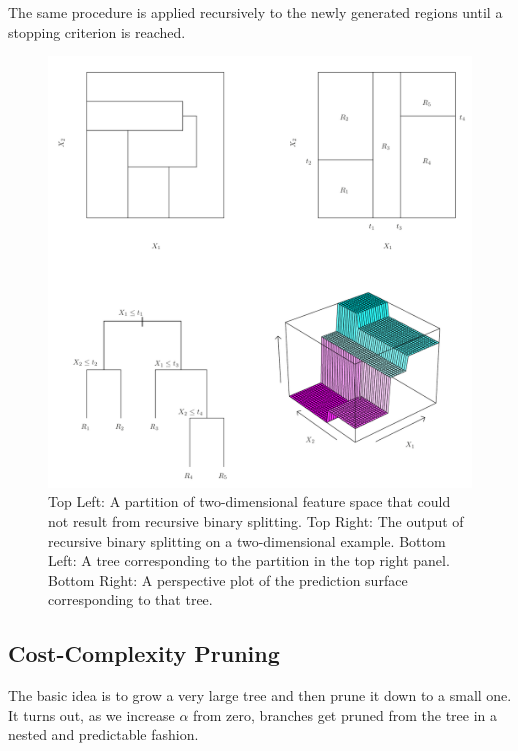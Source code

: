 \documentclass[../Main.tex]{subfiles}
\begin{document}
The same procedure is applied recursively 
to the newly generated regions until a 
stopping criterion is reached.


\begin{figure}[H]
    \centering
    \includegraphics[width=0.75\linewidth]{Images/tree-based-splits.png}
    \caption{Top Left: A partition of two-dimensional feature space that could
    not result from recursive binary splitting. Top Right: The output of recursive
    binary splitting on a two-dimensional example. Bottom Left: A tree corresponding
    to the partition in the top right panel. Bottom Right: A perspective plot of the
    prediction surface corresponding to that tree.}
\end{figure}

\subsection{Cost-Complexity Pruning}
The basic idea is to grow a very large tree and then prune it down to a small one.
It turns out, as we increase \(\alpha\) from zero, 
branches get pruned from the tree in a 
nested and predictable fashion.
\end{document}
